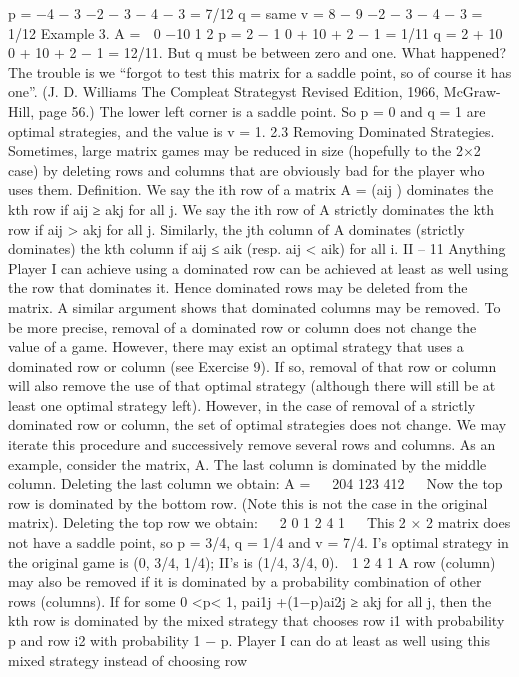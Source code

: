 p = −4 − 3
−2 − 3 − 4 − 3 = 7/12
q = same
v = 8 − 9
−2 − 3 − 4 − 3
= 1/12
Example 3.
A =
 0 −10
1 2  p = 2 − 1
0 + 10 + 2 − 1
= 1/11
q = 2 + 10
0 + 10 + 2 − 1
= 12/11.
But q must be between zero and one. What happened? The trouble is we “forgot to test
this matrix for a saddle point, so of course it has one”. (J. D. Williams The Compleat
Strategyst Revised Edition, 1966, McGraw-Hill, page 56.) The lower left corner is a saddle
point. So p = 0 and q = 1 are optimal strategies, and the value is v = 1.
2.3 Removing Dominated Strategies. Sometimes, large matrix games may be
reduced in size (hopefully to the 2×2 case) by deleting rows and columns that are obviously
bad for the player who uses them.
Definition. We say the ith row of a matrix A = (aij ) dominates the kth row if
aij ≥ akj for all j. We say the ith row of A strictly dominates the kth row if aij > akj
for all j. Similarly, the jth column of A dominates (strictly dominates) the kth column if
aij ≤ aik (resp. aij < aik) for all i.
II – 11
Anything Player I can achieve using a dominated row can be achieved at least as well
using the row that dominates it. Hence dominated rows may be deleted from the matrix.
A similar argument shows that dominated columns may be removed. To be more precise,
removal of a dominated row or column does not change the value of a game. However, there
may exist an optimal strategy that uses a dominated row or column (see Exercise 9). If so,
removal of that row or column will also remove the use of that optimal strategy (although
there will still be at least one optimal strategy left). However, in the case of removal of a
strictly dominated row or column, the set of optimal strategies does not change.
We may iterate this procedure and successively remove several rows and columns. As
an example, consider the matrix, A.
The last column is dominated by the middle
column. Deleting the last column we obtain:
A =
⎛
⎝
204
123
412
⎞
⎠
Now the top row is dominated by the bottom
row. (Note this is not the case in the original
matrix). Deleting the top row we obtain:
⎛
⎝
2 0
1 2
4 1
⎞
⎠
This 2 × 2 matrix does not have a saddle point, so p = 3/4,
q = 1/4 and v = 7/4. I’s optimal strategy in the original game is
(0, 3/4, 1/4); II’s is (1/4, 3/4, 0).
 1 2
4 1
A row (column) may also be removed if it is dominated by a probability combination
of other rows (columns).
If for some 0 <p< 1, pai1j +(1−p)ai2j ≥ akj for all j, then the kth row is dominated
by the mixed strategy that chooses row i1 with probability p and row i2 with probability
1 − p. Player I can do at least as well using this mixed strategy instead of choosing row
